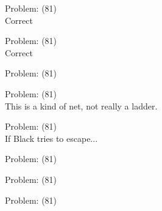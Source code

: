 \documentclass[11pt]{article}
\begin{document}
\begin{minipage}[t]{0.5\textwidth}
  {\centering
  
Problem: (81)\\
Correct\\
  }
\end{minipage}
\begin{minipage}[t]{0.5\textwidth}
  {\centering
  
Problem: (81)\\
Correct\\
  }
\end{minipage}
\begin{minipage}[t]{0.5\textwidth}
  {\centering
  
Problem: (81)\\
  }
\end{minipage}
\begin{minipage}[t]{0.5\textwidth}
  {\centering
  
Problem: (81)\\
This is a kind of net, not really a ladder.\\
  }
\end{minipage}
\begin{minipage}[t]{0.5\textwidth}
  {\centering
  
Problem: (81)\\
If Black tries to escape...\\
  }
\end{minipage}
\begin{minipage}[t]{0.5\textwidth}
  {\centering
  
Problem: (81)\\
  }
\end{minipage}
\begin{minipage}[t]{0.5\textwidth}
  {\centering
  
Problem: (81)\\
  }
\end{minipage}
\begin{minipage}[t]{0.5\textwidth}
  {\centering
  
Problem: (81)\\
  }
\end{minipage}
\end{document}
